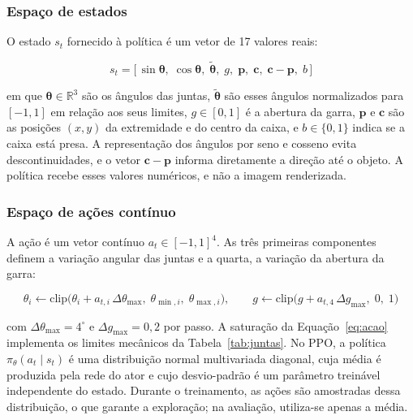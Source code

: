 \subsubsection{Espaço de estados}

O estado $s_t$ fornecido à política é um vetor de 17 valores reais:

\begin{equation}
    s_t = \big[\, \sin\boldsymbol{\theta},\; \cos\boldsymbol{\theta},\; \tilde{\boldsymbol{\theta}},\; g,\; \mathbf{p},\; \mathbf{c},\; \mathbf{c} - \mathbf{p},\; b \,\big]
    \label{eq:estado}
\end{equation}

\noindent em que $\boldsymbol{\theta} \in \mathbb{R}^3$ são os ângulos das juntas, $\tilde{\boldsymbol{\theta}}$ são esses ângulos normalizados para $[-1, 1]$ em relação aos seus limites, $g \in [0, 1]$ é a abertura da garra, $\mathbf{p}$ e $\mathbf{c}$ são as posições $(x, y)$ da extremidade e do centro da caixa, e $b \in \{0, 1\}$ indica se a caixa está presa. A representação dos ângulos por seno e cosseno evita descontinuidades, e o vetor $\mathbf{c} - \mathbf{p}$ informa diretamente a direção até o objeto. A política recebe esses valores numéricos, e não a imagem renderizada.

\subsubsection{Espaço de ações contínuo}

A ação é um vetor contínuo $a_t \in [-1, 1]^4$. As três primeiras componentes definem a variação angular das juntas e a quarta, a variação da abertura da garra:

\begin{equation}
    \theta_i \leftarrow \text{clip}\big(\theta_i + a_{t,i}\,\Delta\theta_{\max},\; \theta_{\min,i},\; \theta_{\max,i}\big),
    \qquad
    g \leftarrow \text{clip}\big(g + a_{t,4}\,\Delta g_{\max},\; 0,\; 1\big)
    \label{eq:acao}
\end{equation}

\noindent com $\Delta\theta_{\max} = 4^\circ$ e $\Delta g_{\max} = 0{,}2$ por passo. A saturação da Equação~\ref{eq:acao} implementa os limites mecânicos da Tabela~\ref{tab:juntas}. No PPO, a política $\pi_\theta(a_t \mid s_t)$ é uma distribuição normal multivariada diagonal, cuja média é produzida pela rede do ator e cujo desvio-padrão é um parâmetro treinável independente do estado. Durante o treinamento, as ações são amostradas dessa distribuição, o que garante a exploração; na avaliação, utiliza-se apenas a média.

